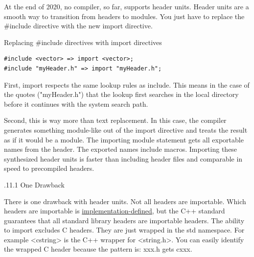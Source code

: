 
At the end of 2020, no compiler, so far, supports header units. Header units are a smooth way to transition from headers to modules. You just have to replace the \#include directive with the new import directive.

\noindent
Replacing \#include directives with import directives
\begin{lstlisting}[style=styleCXX]
#include <vector> => import <vector>;
#include "myHeader.h" => import "myHeader.h";
\end{lstlisting}

First, import respects the same lookup rules as include. This means in the case of the quotes ("myHeader.h") that the lookup first searches in the local directory before it continues with the system search path.

Second, this is way more than text replacement. In this case, the compiler generates something module-like out of the import directive and treats the result as if it would be a module. The importing module statement gets all exportable names from the header. The exported names include macros. Importing these synthesized header units is faster than including header files and comparable in speed to precompiled headers.

.11.1\hspace{0.2cm} One Drawback

There is one drawback with header units. Not all headers are importable. Which headers are importable is \href{https://en.cppreference.com/w/cpp/language/ub}{implementation-defined}, but the C++ standard guarantees that all standard library headers are importable headers. The ability to import excludes C headers. They are just wrapped in the std namespace. For example <cstring> is the C++ wrapper for <string.h>. You can easily identify the wrapped C header because the pattern is: xxx.h gets cxxx.

